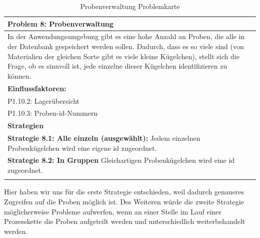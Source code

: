 \documentclass[enabledeprecatedfontcommands,fontsize=12pt,paper=a4,twoside]{scrartcl}
\begin{document}
\begin{table}[H]
    \centering
    \begin{tabular}{|p{15cm}|}
    \hline
          \textbf{Problem 8:} Probenverwaltung
          \\ \hline
         In der Anwendungsumgebung gibt es eine hohe Anzahl an Proben, die alle in der Datenbank gespeichert werden sollen. Dadurch, dass es so viele sind (von Materialien der gleichen Sorte gibt es viele kleine Kügelchen), stellt sich die Frage, ob es sinnvoll ist, jede einzelne dieser Kügelchen identifizieren zu können.
          \\ \hline
          \textbf{Einflussfaktoren: } \\
          P1.10.2: Lagerübersicht \\
	 P1.10.3: Proben-id-Nummern \\
          \hline
          \textbf{Strategien} \\ \hline
	\textbf{Strategie 8.1: Alle einzeln (ausgewählt):} Jedem einzelnen Probenkügelchen wird eine eigene id zugeordnet. \\
	\textbf{Strategie 8.2: In Gruppen} Gleichartigen Probenkügelchen wird eine id zugeordnet. \\
          \\ \hline
    \end{tabular}
    \caption{Probenverwaltung Problemkarte}
    \label{tab:ProblemKarte8}
\end{table}

Hier haben wir uns für die erste Strategie entschieden, weil dadurch genaueres Zugreifen auf die Proben möglich ist. Des Weiteren würde die zweite Strategie möglicherweise Probleme aufwerfen, wenn an einer Stelle im Lauf einer Prozesskette die Proben aufgeteilt werden und unterschiedlich weiterbehandelt werden. \\
\end{document}
